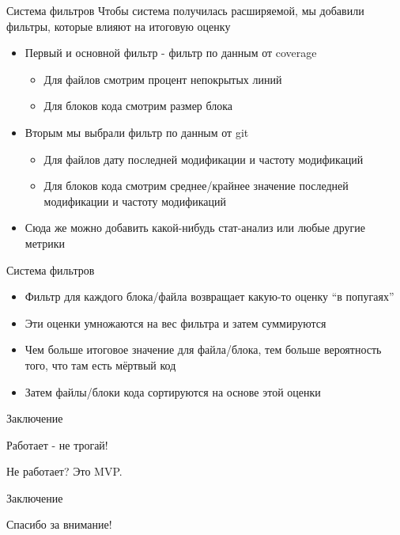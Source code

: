 \documentclass[aspectratio=169]{beamer}
\begin{document}
\begin{frame}{Система фильтров}
    Чтобы система получилась расширяемой, мы добавили фильтры, которые влияют на итоговую оценку
    \begin{itemize}
        \item Первый и основной фильтр - фильтр по данным от coverage
              \begin{itemize}
                  \item Для файлов смотрим процент непокрытых линий
                  \item Для блоков кода смотрим размер блока
              \end{itemize}
        \item Вторым мы выбрали фильтр по данным от git
              \begin{itemize}
                  \item Для файлов дату последней модификации и частоту модификаций
                  \item Для блоков кода смотрим среднее/крайнее значение последней модификации и частоту модификаций
              \end{itemize}
        \item Сюда же можно добавить какой-нибудь стат-анализ или любые другие метрики
    \end{itemize}
\end{frame}


\begin{frame}{Система фильтров}
    \begin{itemize}
        \item Фильтр для каждого блока/файла возвращает какую-то оценку ``в попугаях''
        \item Эти оценки умножаются на вес фильтра и затем суммируются
        \item Чем больше итоговое значение для файла/блока, тем больше вероятность того, что там есть мёртвый код
        \item Затем файлы/блоки кода сортируются на основе этой оценки
    \end{itemize}
\end{frame}

\begin{frame}{Заключение}
    \begin{center}
        Работает - не трогай!

        Не работает? Это MVP.
    \end{center}
\end{frame}

\begin{frame}{Заключение}
    \begin{center}
        Спасибо за внимание!
    \end{center}
\end{frame}
\end{document}
